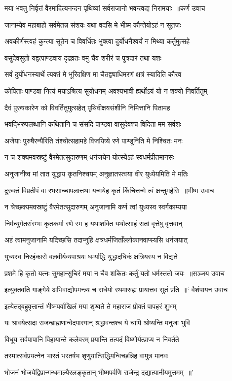 \threelineshloka
{मया भवतु निर्वृत्तं वैरमादित्यनन्दन}
{पृथिव्यां सर्वराजानो भवन्त्वद्य निरामयाः ॥कर्ण उवाच}
{}


\twolineshloka
{जानाम्येव महाबाहो सर्वमेतन्न संशयः}
{यथा वदसि मे भीष्म कौन्तेयोऽहं न सूतजः}


\twolineshloka
{अवकीर्णस्त्वहं कुन्त्या सूतेन च विवर्धितः}
{भुक्त्वा दुर्योधनैश्वर्यं न मिथ्या कर्तुमुत्सहे}


\twolineshloka
{वसुदेवसुतो यद्वत्पाण्डवाय दृढव्रतः}
{वमु चैव शरीरं च पुत्रदारं तथा यशः}


\twolineshloka
{सर्वं दुर्योधनस्यार्थे त्यक्तं मे भूरिदक्षिण}
{मा चैतद्व्याधिमरणं क्षत्रं स्यादिति कौरव}


\twolineshloka
{कोपिताः पाण्डवा नित्यं मयाऽश्रित्य सुयोधनम्}
{अवश्यभावी ह्यर्थोऽयं यो न शक्यो निवर्तितुम्}


\twolineshloka
{दैवं पुरुषकारेण को विवर्तितुमुत्सहेत्}
{पृथिवीक्षयसंशीनि निमित्तानि पितामह}


\twolineshloka
{भवद्भिरुपलब्धानि कथितानि च संसदि}
{पाण्डवा वासुदेवश्च विदिता मम सर्वशः}


\twolineshloka
{अजेयाः पुरुषैरन्यैरिति तंश्चोत्सहामहे}
{विजयिष्ये रणे पाण्डूनिति मे निश्चितः मनः}


\twolineshloka
{न च शक्यमवस्रष्टुं वैरमेतत्सुदारुणम्}
{धनंजयेन योत्स्येऽहं स्वधर्मप्रीतमानसः}


\twolineshloka
{अनुजानीष्व मां तात युद्धाय कृतनिश्चयम्}
{अनुज्ञातस्त्वया वीर युध्येयमिति मे मतिः}


\threelineshloka
{दुरुक्तं विप्रतीपं वा रभसाच्चापलात्तथा}
{यन्मयेह कृतं किंचित्तन्मे त्वं क्षन्तुमर्हसि ॥भीष्म उवाच}
{}


\twolineshloka
{न चेच्छक्यमवस्रष्टुं वैरमेतत्सुदारुणम्}
{अनुजानामि कर्ण त्वां युध्यस्व स्वर्गकाम्यया}


\twolineshloka
{निर्मन्युर्गतसंरम्भः कृतकर्मा रणे स्म ह}
{यथाशक्ति यथोत्साहं सतां वृत्तेषु वृत्तवान्}


\twolineshloka
{अहं त्वामनुजानामि यदिच्छसि तदाप्नुहि}
{क्षत्रधर्मजिताँल्लोकानवाप्स्यसि धनंजयात्}


\twolineshloka
{युध्यस्व निरहंकारो बलवीर्यव्यपाश्रयः}
{धर्म्याद्धि युद्धादधिकं क्षत्रियस्य न विद्यते}


\threelineshloka
{प्रशमे हि कृतो यत्नः सुमहान्सुचिरं मया}
{न चैव शकितः कर्तुं यतो धर्मस्ततो जयः ॥सञ्जय उवाच}
{}


\threelineshloka
{इत्युक्तवति गाङ्गेये अभिवाद्योपमन्त्र्य च}
{राधेयो रथमारुह्य प्रायात्तव सुतं प्रति ॥` वैशंपायन उवाच}
{}


\twolineshloka
{इत्येतद्बहुवृत्तान्तं भीष्मपर्वाखिलं मया}
{शृण्वते ते महाराज प्रोक्तं पापहरं शुभम्}


\twolineshloka
{यः श्रावयेत्सदा राजन्ब्राह्मणान्वेदपारगान्}
{श्रद्धावन्तश्च ये चापि श्रोष्यन्ति मनुजा भुवि}


\twolineshloka
{विधूय सर्वपापानि विहायान्ते कलेवरम्}
{प्रयान्ति तत्पदं विष्णोर्यत्प्राप्य न निवर्तते}


\twolineshloka
{तस्मात्सर्वप्रयत्नेन भारतं भरतर्षभ}
{शृणुयात्सिद्धिमन्विच्छन्निह वामुत्र मानवः}


\twolineshloka
{भोजनं भोजयेद्विप्रान्गन्धमाल्यैरलङ्कृतान्}
{भीष्मपर्वणि राजेन्द्र दद्यात्पानीयमुत्तमम् ॥'}


